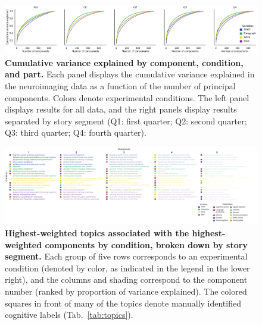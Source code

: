 \documentclass[english]{article}
\begin{document}
\begin{figure}[t]
  \centering
  \includegraphics[width=\textwidth]{figs/variance_explained}

\caption{\textbf{Cumulative variance explained by component, condition, and part.} 
Each panel displays the cumulative variance explained in the neuroimaging data as a function of the number of principal components.
Colors denote experimental conditions.  The left panel displays results for all data, and the right panels display results separated
by story segment (Q1: first quarter; Q2: second quarter; Q3: third quarter; Q4: fourth quarter).}

\label{fig:var-explained}
\end{figure}

\begin{figure}[t]
  \centering
  \includegraphics[width=\textwidth]{figs/top_terms_by_component}

\caption{\textbf{Highest-weighted topics associated with the highest-weighted
components by condition, broken down by story segment.} Each group of five rows
corresponds to an experimental condition (denoted by color, as indicated in the
legend in the lower right), and the columns and shading correspond to the
component number (ranked by proportion of variance explained). The colored
squares in front of many of the topics denote manually identified cognitive
labels (Tab.~\ref{tab:topics}).}

\label{fig:top-terms}
\end{figure}
\end{document}
